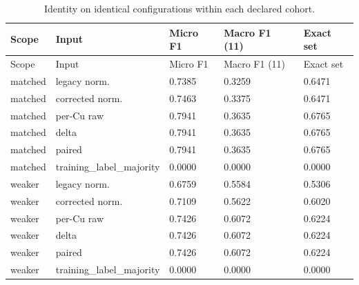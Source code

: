 \documentclass[11pt,a4paper]{article}
\begin{document}
\begingroup\footnotesize\setlength{\tabcolsep}{3pt}
\begin{longtable}{lllll}
\caption{Identity on identical configurations within each declared cohort.}\\
\toprule
Scope & Input & Micro F1 & Macro F1 (11) & Exact set\\\midrule\endfirsthead
Scope & Input & Micro F1 & Macro F1 (11) & Exact set\\\midrule\endhead
matched & legacy norm. & 0.7385 & 0.3259 & 0.6471\\
matched & corrected norm. & 0.7463 & 0.3375 & 0.6471\\
matched & per-Cu raw & 0.7941 & 0.3635 & 0.6765\\
matched & delta & 0.7941 & 0.3635 & 0.6765\\
matched & paired & 0.7941 & 0.3635 & 0.6765\\
matched & training\_label\_majority & 0.0000 & 0.0000 & 0.0000\\
weaker & legacy norm. & 0.6759 & 0.5584 & 0.5306\\
weaker & corrected norm. & 0.7109 & 0.5622 & 0.6020\\
weaker & per-Cu raw & 0.7426 & 0.6072 & 0.6224\\
weaker & delta & 0.7426 & 0.6072 & 0.6224\\
weaker & paired & 0.7426 & 0.6072 & 0.6224\\
weaker & training\_label\_majority & 0.0000 & 0.0000 & 0.0000\\
\bottomrule\end{longtable}\endgroup
\end{document}
